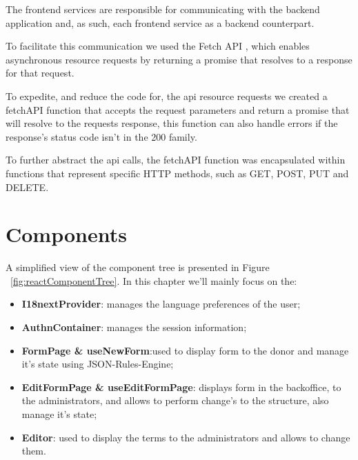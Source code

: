 The frontend services are responsible for communicating with the backend application and, as such, each frontend service as a backend counterpart.

To facilitate this communication we used the Fetch API \cite{Fetch_API}, which enables asynchronous resource requests by returning a promise that resolves to a response for that request.

To expedite, and reduce the code for, the api resource requests we created a fetchAPI function that accepts the request parameters and return a promise that will resolve to the requests response, this function can also handle errors if the response's status code isn't in the 200 family.

To further abstract the api calls,  the fetchAPI function was encapsulated within functions that represent specific HTTP methods, such as GET, POST, PUT and DELETE.

\newpage

\section{Components}

A simplified view of the component tree is presented in Figure ~\ref{fig:reactComponentTree}.
In this chapter we'll mainly focus on the:
\begin{itemize}
	\item \textbf{I18nextProvider}: manages the language preferences of the user;
	\item \textbf{AuthnContainer}: manages the session information;
	\item \textbf{FormPage \& useNewForm}:used to display form to the donor and manage it's state using JSON-Rules-Engine;
	\item \textbf{EditFormPage \& useEditFormPage}:  displays form in the backoffice, to the administrators, and allows to perform change's to the structure, also manage it's state;
	\item \textbf{Editor}: used to display the terms to the administrators and allows to change them. 
\end{itemize}

